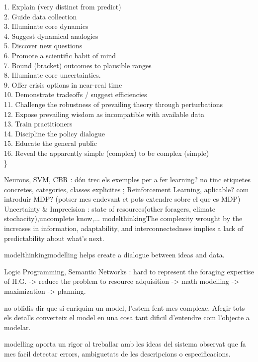 \documentclass{report}
\begin{document}
1. Explain (very distinct from predict)\\
2. Guide data collection\\
3. Illuminate core dynamics\\
4. Suggest dynamical analogies\\
5. Discover new questions\\
6. Promote a scientific habit of mind\\
7. Bound (bracket) outcomes to plausible ranges\\
8. Illuminate core uncertainties.\\
9. Offer crisis options in near-real time\\
10. Demonstrate tradeoffs / suggest efficiencies\\
11. Challenge the robustness of prevailing theory through perturbations\\
12. Expose prevailing wisdom as incompatible with available data\\
13. Train practitioners\\
14. Discipline the policy dialogue\\
15. Educate the general public\\
16. Reveal the apparently simple (complex) to be complex (simple)\\
\}

Neurons, SVM, CBR : d\'on trec els exemples per a fer learning? no tinc etiquetes concretes, categories, classes expli­cites ; Reinforcement Learning, aplicable? com introduir MDP? (potser mes endevant et pots extendre sobre el que es MDP)\\

Uncertainty \& Imprecision : state of resources(other foragers, climate stochacity),uncomplete know,... 
modelthinking{The complexity wrought by the increases in information, adaptability, and interconnectedness implies a lack of predictability about what's next}.

modelthinking{modelling helps create a dialogue between ideas and data}.

Logic Programming, Semantic Networks : hard to represent the foraging expertise of H.G. -> reduce the problem to 
resource adquisition -> math modelling -> maximization -> planning.

no oblidis dir que si enriquim un model, l'estem fent mes complexe. Afegir tots els detalls
converteix el model en una cosa tant difi­cil d'entendre com l'objecte a modelar.

modelling aporta un rigor al treballar amb les ideas del sistema observat que fa mes facil detectar errors, ambiguetats de les descripcions o especificacions. 
\end{document}
